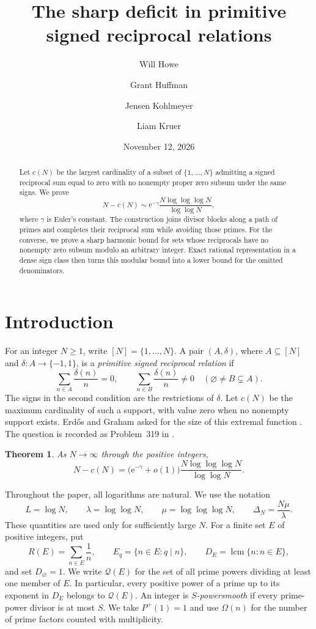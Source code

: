 \documentclass[11pt,leqno]{amsart}
\title[Primitive signed reciprocal relations]{The sharp deficit in primitive signed reciprocal relations}
\author{Will Howe}
\author{Grant Huffman}
\author{Jensen Kohlmeyer}
\author{Liam Kruer}
\date{November 12, 2026}
\numberwithin{equation}{section}
\newtheorem{theorem}{Theorem}[section]
\theoremstyle{definition}
\theoremstyle{remark}
\newcommand{\e}{\mathrm e}
\newcommand{\lcm}{\operatorname{lcm}}
\newcommand{\pp}{\mathcal Q}
\newcommand{\Ph}{P^{+}}
\begin{document}
\begin{abstract}
Let $c(N)$ be the largest cardinality of a subset of $\{1,\ldots,N\}$
admitting a signed reciprocal sum equal to zero with no nonempty proper
zero subsum under the same signs. We prove
\[
 N-c(N)\sim \e^{-\gamma}
 \frac{N\log\log\log N}{\log\log N},
\]
where $\gamma$ is Euler's constant. The construction joins divisor blocks
along a path of primes and completes their reciprocal sum while avoiding
those primes. For the converse, we prove a sharp harmonic bound for sets
whose reciprocals have no nonempty zero subsum modulo an arbitrary
integer. Exact rational representation in a dense sign class then turns
this modular bound into a lower bound for the omitted denominators.
\end{abstract}
\maketitle

\section{Introduction}

For an integer $N\ge1$, write $[N]=\{1,\ldots,N\}$.
A pair $(A,\delta)$, where $A\subseteq[N]$ and
$\delta\colon A\longrightarrow\{-1,1\}$, is a \emph{primitive signed
reciprocal relation} if
\begin{equation}\label{eq:primitive}
 \sum_{n\in A}\frac{\delta(n)}n=0,
 \qquad
 \sum_{n\in B}\frac{\delta(n)}n\ne0
 \quad(\varnothing\ne B\subsetneq A).
\end{equation}
The signs in the second condition are the restrictions of $\delta$.
Let $c(N)$ be the maximum cardinality of such a support, with value zero
when no nonempty support exists. Erd\H{o}s and Graham asked for the size
of this extremal function \cite[p.~43]{EG}. The question is recorded as
Problem~319 in \cite{Bloom319}.

\begin{theorem}\label{thm:main}
As $N\longrightarrow\infty$ through the positive integers,
\begin{equation}\label{eq:main}
 N-c(N)=\bigl(\e^{-\gamma}+o(1)\bigr)
 \frac{N\log\log\log N}{\log\log N}.
\end{equation}
\end{theorem}

Throughout the paper, all logarithms are natural. We use the notation
\begin{equation}\label{eq:scales}
 L=\log N,\qquad \lambda=\log\log N,\qquad
 \mu=\log\log\log N,\qquad \Delta_N=\frac{N\mu}{\lambda}.
\end{equation}
These quantities are used only for sufficiently large $N$.
For a finite set $E$ of positive integers, put
\[
 R(E)=\sum_{n\in E}\frac1n,
 \qquad E_q=\{n\in E:q\mid n\},\qquad D_E=\lcm\{n:n\in E\},
\]
and set $D_\varnothing=1$. We write $\pp(E)$ for the set of all prime
powers dividing at least one member of $E$. In particular, every positive
power of a prime up to its exponent in $D_E$ belongs to $\pp(E)$.
An integer is \emph{$S$-powersmooth} if every prime-power divisor is at
most $S$. We take $\Ph(1)=1$ and use $\Omega(n)$ for the number of prime
factors counted with multiplicity.
\end{document}
